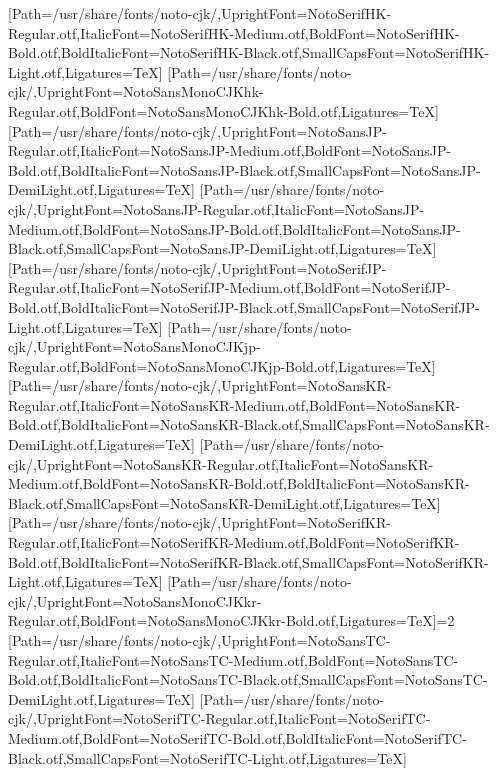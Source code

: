 \newfontfamily{}[Path=/usr/share/fonts/noto-cjk/,UprightFont=NotoSerifHK-Regular.otf,ItalicFont=NotoSerifHK-Medium.otf,BoldFont=NotoSerifHK-Bold.otf,BoldItalicFont=NotoSerifHK-Black.otf,SmallCapsFont=NotoSerifHK-Light.otf,Ligatures=TeX]
\newfontfamily{}[Path=/usr/share/fonts/noto-cjk/,UprightFont=NotoSansMonoCJKhk-Regular.otf,BoldFont=NotoSansMonoCJKhk-Bold.otf,Ligatures=TeX]
\newfontfamily{}[Path=/usr/share/fonts/noto-cjk/,UprightFont=NotoSansJP-Regular.otf,ItalicFont=NotoSansJP-Medium.otf,BoldFont=NotoSansJP-Bold.otf,BoldItalicFont=NotoSansJP-Black.otf,SmallCapsFont=NotoSansJP-DemiLight.otf,Ligatures=TeX]
\newfontfamily{}[Path=/usr/share/fonts/noto-cjk/,UprightFont=NotoSansJP-Regular.otf,ItalicFont=NotoSansJP-Medium.otf,BoldFont=NotoSansJP-Bold.otf,BoldItalicFont=NotoSansJP-Black.otf,SmallCapsFont=NotoSansJP-DemiLight.otf,Ligatures=TeX]
\newfontfamily{}[Path=/usr/share/fonts/noto-cjk/,UprightFont=NotoSerifJP-Regular.otf,ItalicFont=NotoSerifJP-Medium.otf,BoldFont=NotoSerifJP-Bold.otf,BoldItalicFont=NotoSerifJP-Black.otf,SmallCapsFont=NotoSerifJP-Light.otf,Ligatures=TeX]
\newfontfamily{}[Path=/usr/share/fonts/noto-cjk/,UprightFont=NotoSansMonoCJKjp-Regular.otf,BoldFont=NotoSansMonoCJKjp-Bold.otf,Ligatures=TeX]
\newfontfamily{}[Path=/usr/share/fonts/noto-cjk/,UprightFont=NotoSansKR-Regular.otf,ItalicFont=NotoSansKR-Medium.otf,BoldFont=NotoSansKR-Bold.otf,BoldItalicFont=NotoSansKR-Black.otf,SmallCapsFont=NotoSansKR-DemiLight.otf,Ligatures=TeX]
\newfontfamily{}[Path=/usr/share/fonts/noto-cjk/,UprightFont=NotoSansKR-Regular.otf,ItalicFont=NotoSansKR-Medium.otf,BoldFont=NotoSansKR-Bold.otf,BoldItalicFont=NotoSansKR-Black.otf,SmallCapsFont=NotoSansKR-DemiLight.otf,Ligatures=TeX]
\newfontfamily{}[Path=/usr/share/fonts/noto-cjk/,UprightFont=NotoSerifKR-Regular.otf,ItalicFont=NotoSerifKR-Medium.otf,BoldFont=NotoSerifKR-Bold.otf,BoldItalicFont=NotoSerifKR-Black.otf,SmallCapsFont=NotoSerifKR-Light.otf,Ligatures=TeX]
\newfontfamily{}[Path=/usr/share/fonts/noto-cjk/,UprightFont=NotoSansMonoCJKkr-Regular.otf,BoldFont=NotoSansMonoCJKkr-Bold.otf,Ligatures=TeX]\else\ifnum\value{NotoCJKFamily}=2
\newfontfamily{}[Path=/usr/share/fonts/noto-cjk/,UprightFont=NotoSansTC-Regular.otf,ItalicFont=NotoSansTC-Medium.otf,BoldFont=NotoSansTC-Bold.otf,BoldItalicFont=NotoSansTC-Black.otf,SmallCapsFont=NotoSansTC-DemiLight.otf,Ligatures=TeX]
\newfontfamily{}[Path=/usr/share/fonts/noto-cjk/,UprightFont=NotoSerifTC-Regular.otf,ItalicFont=NotoSerifTC-Medium.otf,BoldFont=NotoSerifTC-Bold.otf,BoldItalicFont=NotoSerifTC-Black.otf,SmallCapsFont=NotoSerifTC-Light.otf,Ligatures=TeX]
